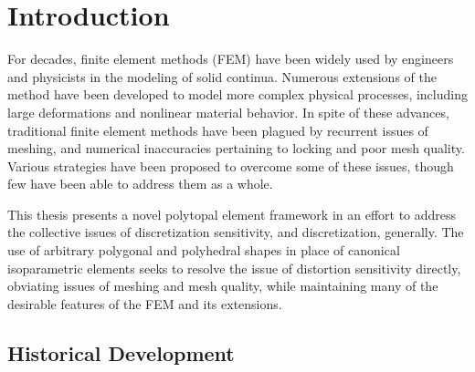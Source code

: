 \chapter{Introduction}


	For decades, finite element methods (FEM) have been widely used by engineers and physicists in the modeling of solid continua. Numerous extensions of the method have been developed to model more complex physical processes, including large deformations and nonlinear material behavior.
	In spite of these advances, traditional finite element methods have been plagued by recurrent issues of meshing, and numerical inaccuracies pertaining to locking and poor mesh quality. Various strategies have been proposed to overcome some of these issues, though few have been able to address them as a whole.
	
	This thesis presents a novel polytopal element framework in an effort to address the collective issues of discretization sensitivity, and discretization, generally. The use of arbitrary polygonal and polyhedral shapes in place of canonical isoparametric elements seeks to resolve the issue of distortion sensitivity directly, obviating issues of meshing and mesh quality, while maintaining many of the desirable features of the FEM and its extensions.

\section{Historical Development} %

